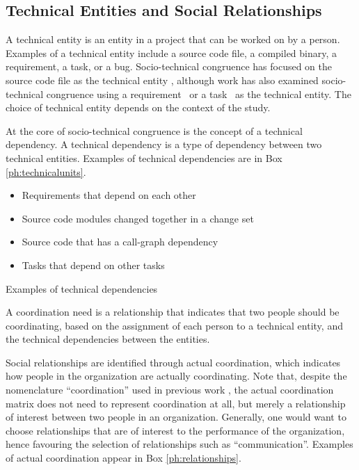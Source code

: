 \subsection{Technical Entities and Social Relationships}
A technical entity is an entity in a project that can be worked on by a person. Examples of a technical entity include a source code file, a compiled binary, a requirement, a task, or a bug. Socio-technical congruence has focused on the source code file as the technical entity \cite{cataldo:cscw:2006, ehrlich:stc:2008}, although work has also examined socio-technical congruence using a requirement~\cite{damian2010:rdc,marczak2009:crossfunctional} or a task~\cite{wolf:ieee:2009} as the technical entity. The choice of technical entity depends on the context of the study.

At the core of socio-technical congruence is the concept of a technical dependency. A technical dependency is a type of dependency between two technical entities. Examples of technical dependencies are in Box \ref{ph:technicalunits}.

\begin{placeholder}[t]
\begin{itemize}
\item Requirements that depend on each other~\cite{marczak:re:2008,marczak2009:crossfunctional}
\item Source code modules changed together in a change set~\cite{cataldo:cscw:2006,cataldo:esem:2008}
\item Source code that has a call-graph dependency~\cite{deSouza2004:thwarts_collaboration}
\item Tasks that depend on other tasks \cite{wolf:ieee:2009}
\end{itemize}
\caption{Examples of technical dependencies}
\label{ph:technicalunits}
\end{placeholder}

A coordination need is a relationship that indicates that two people should be coordinating, based on the assignment of each person to a technical entity, and the technical dependencies between the entities.

Social relationships are identified through actual coordination, which indicates how people in the organization are actually coordinating. Note that, despite the nomenclature ``coordination'' used in previous work \cite{cataldo:cscw:2006}, the actual coordination matrix does not need to represent coordination at all, but merely a relationship of interest between two people in an organization. Generally, one would want to choose relationships that are of interest to the performance of the organization, hence favouring the selection of relationships such as ``communication''. Examples of actual coordination appear in Box \ref{ph:relationships}.

